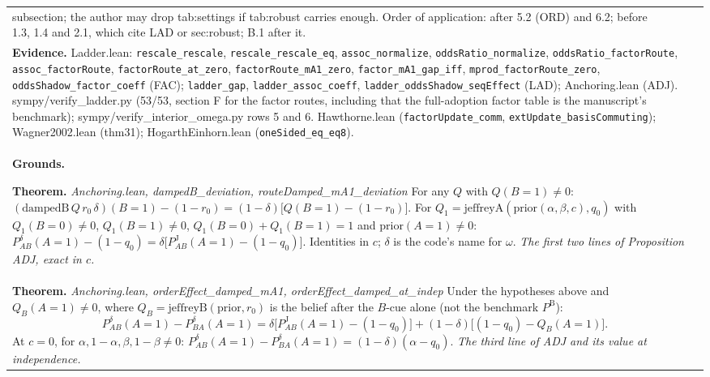 \documentclass[10pt]{article}
\theoremstyle{definition}
\newcommand{\PB}{P^{\mathrm{B}}}
\newcommand{\PJ}{P^{\mathrm{J}}}
\newlength{\fullw}\setlength{\fullw}{25.9cm}
\begin{document}
{\begin{longtable}{|p{0.9cm}|p{12.2cm}|p{12.2cm}|}
subsection; the author may drop tab:settings if tab:robust carries enough. Order of application: after 5.2 (ORD) and 6.2; before 1.3, 1.4 and 2.1, which cite LAD or sec:robust; B.1 after it.} \\
\multicolumn{3}{|p{\fullw}|}{\textbf{Evidence.} Ladder.lean: \texttt{rescale\_rescale}, \texttt{rescale\_rescale\_eq}, \texttt{assoc\_normalize}, \texttt{oddsRatio\_normalize}, \texttt{oddsRatio\_factorRoute}, \texttt{assoc\_factorRoute}, \texttt{factorRoute\_at\_zero}, \texttt{factorRoute\_mA1\_zero}, \texttt{factor\_mA1\_gap\_iff}, \texttt{mprod\_factorRoute\_zero}, \texttt{oddsShadow\_factor\_coeff} (FAC); \texttt{ladder\_gap}, \texttt{ladder\_assoc\_coeff}, \texttt{ladder\_oddsShadow\_seqEffect} (LAD); Anchoring.lean (ADJ). sympy/verify\_ladder.py (53/53, section F for the factor routes, including that the full-adoption factor table is the manuscript's benchmark); sympy/verify\_interior\_omega.py rows 5 and 6. Hawthorne.lean (\texttt{factorUpdate\_comm}, \texttt{extUpdate\_basisCommuting}); Wagner2002.lean (thm31); HogarthEinhorn.lean (\texttt{oneSided\_eq\_eq8}).} \\ \hline
\multicolumn{3}{|p{\fullw}|}{\textbf{Grounds.}\par \textbf{Theorem.} \textit{Anchoring.lean, dampedB\_deviation, routeDamped\_mA1\_deviation} \newline For any $Q$ with $Q(B{=}1)\neq0$:
$(\mathrm{dampedB}\,Q\,r_0\,\delta)(B{=}1)-(1-r_0)=(1-\delta)\bigl[Q(B{=}1)-(1-r_0)\bigr]$.
For $Q_1=\mathrm{jeffreyA}(\mathrm{prior}(\alpha,\beta,c),q_0)$ with $Q_1(B{=}0)\neq0$,
$Q_1(B{=}1)\neq0$, $Q_1(B{=}0)+Q_1(B{=}1)=1$ and $\mathrm{prior}(A{=}1)\neq0$:
$P^{\delta}_{AB}(A{=}1)-(1-q_0)=\delta\bigl[\PJ_{AB}(A{=}1)-(1-q_0)\bigr]$.
Identities in $c$; $\delta$ is the code's name for $\omega$. \newline \textit{The first two lines of Proposition ADJ, exact in $c$.}} \\
\multicolumn{3}{|p{\fullw}|}{\textbf{Theorem.} \textit{Anchoring.lean, orderEffect\_damped\_mA1, orderEffect\_damped\_at\_indep} \newline Under the hypotheses above and $Q_B(A{=}1)\neq0$, where
$Q_B=\mathrm{jeffreyB}(\mathrm{prior},r_0)$ is the belief after the $B$-cue alone (not the benchmark $\PB$):
\[
P^{\delta}_{AB}(A{=}1)-P^{\delta}_{BA}(A{=}1)
 =\delta\bigl[\PJ_{AB}(A{=}1)-(1-q_0)\bigr]+(1-\delta)\bigl[(1-q_0)-Q_B(A{=}1)\bigr].
\]
At $c=0$, for $\alpha,1-\alpha,\beta,1-\beta\neq0$:
$P^{\delta}_{AB}(A{=}1)-P^{\delta}_{BA}(A{=}1)=(1-\delta)(\alpha-q_0)$. \newline \textit{The third line of ADJ and its value at independence.}} \\

\end{longtable}}
\end{document}
